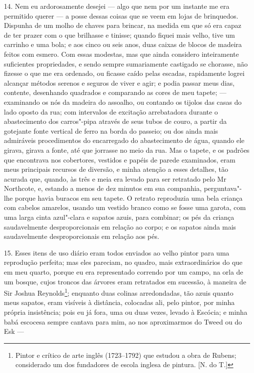 14. Nem eu ardorosamente desejei --- algo que nem por um instante me era
permitido querer --- a posse dessas coisas que se veem em lojas de
brinquedos. Dispunha de um molho de chaves para brincar, na medida em
que só era capaz de ter prazer com o que brilhasse e tinisse; quando
fiquei mais velho, tive um carrinho e uma bola; e aos cinco ou seis
anos, duas caixas de blocos de madeira feitos com esmero. Com essas
modestas, mas que ainda considero inteiramente suficientes propriedades,
e sendo sempre sumariamente castigado se chorasse, não fizesse o que me
era ordenado, ou ficasse caído pelas escadas, rapidamente logrei
alcançar métodos serenos e seguros de viver e agir; e podia passar meus
dias, contente, desenhando quadrados e comparando as cores de meu
tapete; --- examinando os nós da madeira do assoalho, ou contando os
tijolos das casas do lado oposto da rua; com intervalos de excitação
arrebatadora durante o abastecimento dos carros"-pipa através de seus
tubos de couro, a partir da gotejante fonte vertical de ferro na borda
do passeio; ou dos ainda mais admiráveis procedimentos do encarregado do
abastecimento de água, quando ele girava, girava a fonte, até que
jorrasse no meio da rua. Mas o tapete, e os padrões que encontrava nos
cobertores, vestidos e papéis de parede examinados, eram meus principais
recursos de diversão, e minha atenção a esses detalhes, tão acurada que,
quando, às três e meia era levado para ser retratado pelo Mr Northcote,
e, estando a menos de dez minutos em sua companhia, perguntava"-lhe
porque havia buracos em seu tapete. O retrato reproduzia uma bela
criança com cabelos amarelos, usando um vestido branco como se fosse uma
garota, com uma larga cinta azul"-clara e sapatos azuis, para combinar;
os pés da criança saudavelmente desproporcionais em relação ao corpo; e
os sapatos ainda mais saudavelmente desproporcionais em relação aos pés.

15. Esses itens de uso diário eram todos enviados ao velho pintor para
uma reprodução perfeita; mas eles pareciam, no quadro, mais
extraordinários do que em meu quarto, porque eu era representado
correndo por um campo, na orla de um bosque, cujos troncos das árvores
eram retratados em sucessão, à maneira de Sir Joshua Reynolds\footnote{Pintor
  e crítico de arte inglês (1723--1792) que estudou a obra de Rubens;
  considerado um dos fundadores de escola inglesa de pintura. {[}N. do
  T.{]}}; enquanto duas colinas arredondadas, tão azuis quanto meus
sapatos, eram visíveis à distância, colocadas ali, pelo pintor, por
minha própria insistência; pois eu já fora, uma ou duas vezes, levado à
Escócia; e minha babá escocesa sempre cantava para mim, ao nos
aproximarmos do Tweed ou do Esk ---

